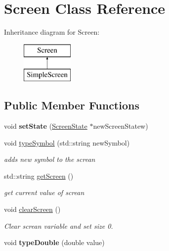 \hypertarget{class_screen}{}\section{Screen Class Reference}
\label{class_screen}
Inheritance diagram for Screen\+:\begin{figure}[H]
\begin{center}
\leavevmode
\includegraphics[height=2.000000cm]{class_screen}
\end{center}
\end{figure}
\subsection*{Public Member Functions}
\begin{DoxyCompactItemize}
\item 
\hypertarget{class_screen_a77de1ee1d98d21bb8bab21e9f507c369}{}void {\bfseries set\+State} (\hyperlink{class_screen_state}{Screen\+State} $\ast$new\+Screen\+Statew)\label{class_screen_a77de1ee1d98d21bb8bab21e9f507c369}

\item 
void \hyperlink{class_screen_a43f495857effafe04848a91dfc229fbe}{type\+Symbol} (std\+::string new\+Symbol)
\begin{DoxyCompactList}\small\item\em adds new symbol to the screan \end{DoxyCompactList}\item 
std\+::string \hyperlink{class_screen_a82445b0bebdac598ab96fecdd362e387}{get\+Screen} ()
\begin{DoxyCompactList}\small\item\em get current value of screan \end{DoxyCompactList}\item 
\hypertarget{class_screen_ab8f41de38bab8a2a16eb40fb66af00f2}{}void \hyperlink{class_screen_ab8f41de38bab8a2a16eb40fb66af00f2}{clear\+Screen} ()\label{class_screen_ab8f41de38bab8a2a16eb40fb66af00f2}

\begin{DoxyCompactList}\small\item\em Clear screan variable and set size 0. \end{DoxyCompactList}\item 
\hypertarget{class_screen_a1ab0cbcdffb9e088ee5439d0bea82d2f}{}void {\bfseries type\+Double} (double value)\label{class_screen_a1ab0cbcdffb9e088ee5439d0bea82d2f}

\end{DoxyCompactItemize}
